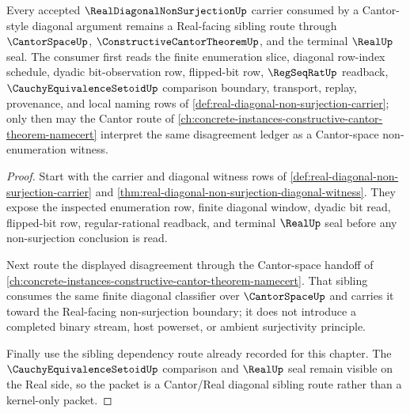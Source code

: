 \begin{theorem}
\label{thm:real-diagonal-non-surjection-cantor-sibling-route}
Every accepted $\RealDiagonalNonSurjectionUp$ carrier consumed by a Cantor-style diagonal argument remains a Real-facing sibling route through $\CantorSpaceUp$, $\ConstructiveCantorTheoremUp$, and the terminal $\RealUp$ seal. The consumer first reads the finite enumeration slice, diagonal row-index schedule, dyadic bit-observation row, flipped-bit row, $\RegSeqRatUp$ readback, $\CauchyEquivalenceSetoidUp$ comparison boundary, transport, replay, provenance, and local naming rows of \autoref{def:real-diagonal-non-surjection-carrier}; only then may the Cantor route of \autoref{ch:concrete-instances-constructive-cantor-theorem-namecert} interpret the same disagreement ledger as a Cantor-space non-enumeration witness.
\end{theorem}
\begin{proof}
Start with the carrier and diagonal witness rows of \autoref{def:real-diagonal-non-surjection-carrier} and \autoref{thm:real-diagonal-non-surjection-diagonal-witness}. They expose the inspected enumeration row, finite diagonal window, dyadic bit read, flipped-bit row, regular-rational readback, and terminal $\RealUp$ seal before any non-surjection conclusion is read.

Next route the displayed disagreement through the Cantor-space handoff of \autoref{ch:concrete-instances-constructive-cantor-theorem-namecert}. That sibling consumes the same finite diagonal classifier over $\CantorSpaceUp$ and carries it toward the Real-facing non-surjection boundary; it does not introduce a completed binary stream, host powerset, or ambient surjectivity principle.

Finally use the sibling dependency route already recorded for this chapter. The $\CauchyEquivalenceSetoidUp$ comparison and $\RealUp$ seal remain visible on the Real side, so the packet is a Cantor/Real diagonal sibling route rather than a kernel-only packet.
\end{proof}
